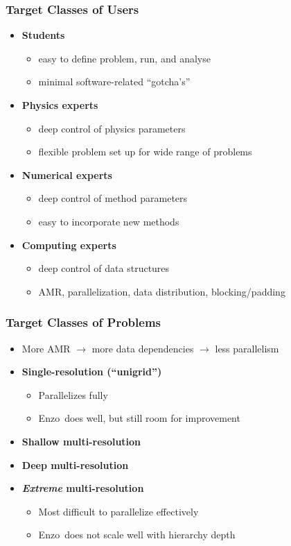 \documentclass{beamer}
\newcommand{\enzo}{\textsf{Enzo}}
\begin{document}
\begin{frame}
\frametitle{Target Classes of Users}
\begin{itemize}
\item \textbf{Students}
\begin{itemize}
\item easy to define problem, run, and analyse
\item minimal software-related ``gotcha's''
\end{itemize}
\item \textbf{Physics experts}
\begin{itemize}
\item deep control of physics parameters
\item flexible problem set up for wide range of problems
\end{itemize}
\item \textbf{Numerical experts}
\begin{itemize}
\item deep control of method parameters
\item easy to incorporate new methods
\end{itemize}
\item \textbf{Computing experts}
\begin{itemize}
\item deep control of data structures
\item AMR, parallelization, data distribution, blocking/padding
\end{itemize}
\end{itemize}
\end{frame}

\begin{frame}
\frametitle{Target Classes of Problems}

\begin{itemize}
\item More AMR $\rightarrow$ more data dependencies $\rightarrow$ less parallelism
\item \textbf{Single-resolution (``unigrid'')}
\begin{itemize}
\item Parallelizes fully
\item \enzo\ does well, but still room for improvement
\end{itemize}
\item \textbf{Shallow multi-resolution}
\item \textbf{Deep multi-resolution}
\item \textbf{\textit{Extreme} multi-resolution}
\begin{itemize}
\item Most difficult to parallelize effectively
\item \enzo\ does not scale well with hierarchy depth
\end{itemize}
\end{itemize}
\end{frame}
\end{document}
